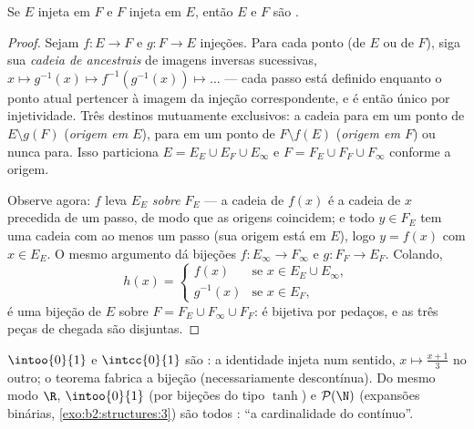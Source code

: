 \begin{theorem}\label{thm:b2:structures:cantorbernstein}
Se $E$ injeta em $F$ e $F$ injeta em $E$, então $E$ e $F$
são .
\end{theorem}

\begin{proof}
Sejam $f \colon E \to F$ e $g \colon F \to E$ injeções. Para
cada ponto (de $E$ ou de $F$), siga sua \emph{cadeia de ancestrais} de
imagens inversas sucessivas, $x \mapsto g^{-1}(x) \mapsto
f^{-1}(g^{-1}(x)) \mapsto \dots$ --- cada passo está definido enquanto
o ponto atual pertencer à imagem da injeção correspondente, e é
então único por injetividade. Três destinos mutuamente exclusivos:
a cadeia para em um ponto de $E \setminus g(F)$ (\emph{origem em
$E$}), para em um ponto de $F \setminus f(E)$ (\emph{origem em
$F$}) ou nunca para. Isso particiona $E = E_E \cup E_F \cup
E_\infty$ e $F = F_E \cup F_F \cup F_\infty$ conforme a
origem.

Observe agora: $f$ leva $E_E$ \emph{sobre} $F_E$ --- a cadeia de
$f(x)$ é a cadeia de $x$ precedida de um passo, de modo que as origens coincidem;
e todo $y \in F_E$ tem uma cadeia com ao menos um passo (sua origem
está em $E$), logo $y = f(x)$ com $x \in E_E$. O mesmo argumento
dá bijeções $f \colon E_\infty \to F_\infty$ e $g \colon F_F
\to E_F$. Colando,
\[
h(x) =
\begin{cases}
f(x) & \text{se } x \in E_E \cup E_\infty,\\
g^{-1}(x) & \text{se } x \in E_F,
\end{cases}
\]
é uma bijeção de $E$ sobre $F = F_E \cup F_\infty \cup F_F$: é
bijetiva por pedaços, e as três peças de chegada são disjuntas.
\end{proof}

\begin{example}\label{ex:b2:structures:cbexample}
$\intoo{0}{1}$ e $\intcc{0}{1}$ são : a identidade
injeta num sentido, $x \mapsto \frac{x + 1}{3}$ no outro; o teorema
fabrica a bijeção (necessariamente descontínua). Do mesmo modo
$\R$, $\intoo{0}{1}$ (por bijeções do tipo $\tanh$) e
$\mathcal{P}(\N)$ (expansões binárias, \cref{exo:b2:structures:3})
são todos : ``a cardinalidade do contínuo''.
\end{example}

